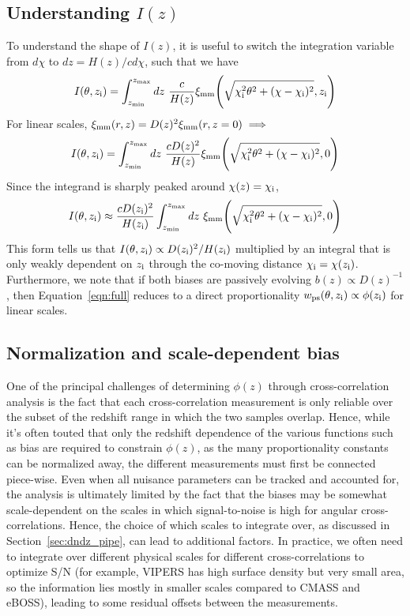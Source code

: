 \documentclass[a4paper,usenatbib]{mnras}
\begin{document}
\subsection{Understanding $I(z)$}
To understand the shape of $I(z)$, it is useful to switch the integration variable from $d\chi$ to $dz = H(z)/c d\chi$, such that we have
%
\begin{equation}\label{defn_I_z}
    I(\theta, z_{\rm i}) = \int_{z_{\rm min}}^{z_{\rm max}}dz \ \frac{c}{H(z)}\xi_{\rm mm}{\Bigg (}\sqrt{\chi_{\rm i}^2\theta^2 + (\chi-\chi_{\rm i})^2},z_{\rm i}{\Bigg )}
\end{equation}
%
For linear scales, $\xi_{\rm mm}(r,z) = D(z)^2 \xi_{\rm mm}(r,z=0) \implies$
\begin{align}\label{linear_growth}
    I(\theta, z_{\rm i}) = \int_{z_{\rm min}}^{z_{\rm max}}dz \ \frac{cD(z)^2}{H(z)}\xi_{\rm mm}{\Bigg (}\sqrt{\chi_{\rm i}^2\theta^2 + (\chi-\chi_{\rm i})^2},0{\Bigg )}
\end{align}
%
Since the integrand is sharply peaked around $\chi(z) = \chi_{\rm i}$,
%
\begin{equation}
    I(\theta, z_{\rm i}) \approx \frac{cD(z_{\rm i})^2}{H(z_{\rm i})} \int_{z_{\rm min}}^{z_{\rm max}}dz \ \xi_{\rm mm}{\Bigg (}\sqrt{\chi_{\rm i}^2\theta^2 + (\chi-\chi_{\rm i})^2},0{\Bigg )}
\end{equation}
%
This form tells us that $I(\theta, z_{\rm i}) \propto D(z_{\rm i})^2/H(z_{\rm i})$ multiplied by an integral that is only weakly dependent on $z_{\rm i}$ through the co-moving distance $\chi_{\rm i} = \chi(z_{\rm i})$. Furthermore, we note that if both biases are passively evolving $b(z) \propto D(z)^{-1}$, then Equation~\ref{eqn:full} reduces to a direct proportionality $w_{\rm ps}(\theta, z_{\rm i}) \propto \phi(z_{\rm i})$ for linear scales.

\subsection{Normalization and scale-dependent bias}

One of the principal challenges of determining $\phi(z)$ through cross-correlation analysis is the fact that each cross-correlation measurement is only reliable over the subset of the redshift range in which the two samples overlap. Hence, while it's often touted that only the redshift dependence of the various functions such as bias are required to constrain $\phi(z)$, as the many proportionality constants can be normalized away, the different measurements must first be connected piece-wise. Even when all nuisance parameters can be tracked and accounted for, the analysis is ultimately limited by the fact that the biases may be somewhat scale-dependent on the scales in which signal-to-noise is high for angular cross-correlations. Hence, the choice of which scales to integrate over, as discussed in Section~\ref{sec:dndz_pipe}, can lead to additional factors. In practice, we often need to integrate over different physical scales for different cross-correlations to optimize S/N (for example, VIPERS has high surface density but very small area, so the information lies mostly in smaller scales compared to CMASS and eBOSS), leading to some residual offsets between the measurements.
\end{document}
